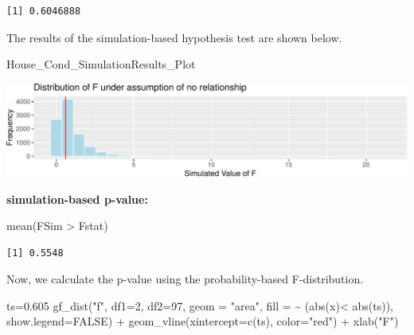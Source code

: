 \documentclass[
  letterpaper,
  DIV=11,
  numbers=noendperiod]{scrreprt}
\newenvironment{Shaded}{\begin{snugshade}}{\end{snugshade}}
\newcommand{\AttributeTok}[1]{\textcolor[rgb]{0.40,0.45,0.13}{#1}}
\newcommand{\ConstantTok}[1]{\textcolor[rgb]{0.56,0.35,0.01}{#1}}
\newcommand{\DecValTok}[1]{\textcolor[rgb]{0.68,0.00,0.00}{#1}}
\newcommand{\FloatTok}[1]{\textcolor[rgb]{0.68,0.00,0.00}{#1}}
\newcommand{\FunctionTok}[1]{\textcolor[rgb]{0.28,0.35,0.67}{#1}}
\newcommand{\NormalTok}[1]{\textcolor[rgb]{0.00,0.23,0.31}{#1}}
\newcommand{\OtherTok}[1]{\textcolor[rgb]{0.00,0.23,0.31}{#1}}
\newcommand{\SpecialCharTok}[1]{\textcolor[rgb]{0.37,0.37,0.37}{#1}}
\newcommand{\StringTok}[1]{\textcolor[rgb]{0.13,0.47,0.30}{#1}}
\begin{document}
\begin{verbatim}
[1] 0.6046888
\end{verbatim}

The results of the simulation-based hypothesis test are shown below.

\begin{Shaded}
\begin{Highlighting}[]
\NormalTok{House\_Cond\_SimulationResults\_Plot}
\end{Highlighting}
\end{Shaded}

\includegraphics{Ch4_files/figure-pdf/unnamed-chunk-47-1.pdf}

\textbf{simulation-based p-value:}

\begin{Shaded}
\begin{Highlighting}[]
\FunctionTok{mean}\NormalTok{(FSim }\SpecialCharTok{\textgreater{}}\NormalTok{ Fstat)}
\end{Highlighting}
\end{Shaded}

\begin{verbatim}
[1] 0.5548
\end{verbatim}

Now, we calculate the p-value using the probability-based
F-distribution.

\begin{Shaded}
\begin{Highlighting}[]
\NormalTok{ts}\OtherTok{=}\FloatTok{0.605}
\FunctionTok{gf\_dist}\NormalTok{(}\StringTok{"f"}\NormalTok{, }\AttributeTok{df1=}\DecValTok{2}\NormalTok{, }\AttributeTok{df2=}\DecValTok{97}\NormalTok{, }\AttributeTok{geom =} \StringTok{"area"}\NormalTok{, }\AttributeTok{fill =} \SpecialCharTok{\textasciitilde{}}\NormalTok{ (}\FunctionTok{abs}\NormalTok{(x)}\SpecialCharTok{\textless{}} \FunctionTok{abs}\NormalTok{(ts)), }\AttributeTok{show.legend=}\ConstantTok{FALSE}\NormalTok{) }\SpecialCharTok{+} \FunctionTok{geom\_vline}\NormalTok{(}\AttributeTok{xintercept=}\FunctionTok{c}\NormalTok{(ts), }\AttributeTok{color=}\StringTok{"red"}\NormalTok{)  }\SpecialCharTok{+} \FunctionTok{xlab}\NormalTok{(}\StringTok{"F"}\NormalTok{)}
\end{Highlighting}
\end{Shaded}
\end{document}
